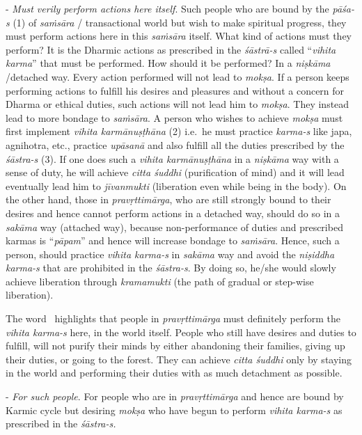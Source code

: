 - \emph{Must verily perform actions here itself}. Such people who are bound by the \emph{pāśa-s} (1) of \emph{saṁsāra} / transactional world but wish to make spiritual progress, they must perform actions here in this \emph{saṁsāra} itself. What kind of actions must they perform? It is the Dharmic actions as prescribed in the \emph{śāstrā-s} called ``\emph{vihita karma}'' that must be performed. How should it be performed? In a \emph{niṣkāma} /detached way. Every action performed will not lead to \emph{mokṣa}. If a person keeps performing actions to fulfill his desires and pleasures and without a concern for Dharma or ethical duties, such actions will not lead him to \emph{mokṣa}. They instead lead to more bondage to \emph{saṁsāra}. A person who wishes to achieve \emph{mokṣa} must first implement \emph{vihita karmānuṣṭhāna} (2) i.e.\ he must practice \emph{karma-s} like japa, agnihotra, etc., practice \emph{upāsanā} and also fulfill all the duties prescribed by the \emph{śāstra-s} (3). If one does such a \emph{vihita karmānuṣṭhāna} in a \emph{niṣkāma} way with a sense of duty, he will achieve \emph{citta śuddhi} (purification of mind) and it will lead eventually lead him to \emph{jīvanmukti} (liberation even while being in the body). On the other hand, those in \emph{pravṛttimārga}, who are still strongly bound to their desires and hence cannot perform actions in a detached way, should do so in a \emph{sakāma} way (attached way), because non-performance of duties and prescribed karmas is ``\emph{pāpam}'' and hence will increase bondage to \emph{saṁsāra}. Hence, such a person, should practice \emph{vihita karma-s} in \emph{sakāma} way and avoid the \emph{niṣiddha karma-s} that are prohibited in the \emph{śāstra-s}. By doing so, he/she would slowly achieve liberation through \emph{kramamukti} (the path of gradual or step-wise liberation).

The word ~highlights that people in \emph{pravṛttimārga} must definitely perform the \emph{vihita karma-s} here, in the world itself. People who still have desires and duties to fulfill, will not purify their minds by either abandoning their families, giving up their duties, or going to the forest. They can achieve \emph{citta śuddhi} only by staying in the world and performing their duties with as much detachment as possible.
\eject

- \emph{For such people}. For people who are in \emph{pravṛttimārga} and hence are bound by Karmic cycle but desiring \emph{mokṣa} who have begun to perform \emph{vihita karma-s} as prescribed in the \emph{śāstra-s.}

